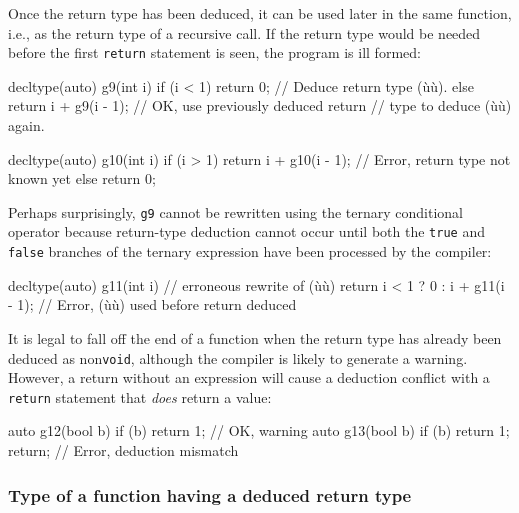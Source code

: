 \noindent Once the return type has been deduced, it can be used later in the same
function, i.e., as the return type of a recursive call. If the return
type would be needed before the first \lstinline!return! statement is seen,
the program is ill formed:

\begin{emcppslisting}
decltype(auto) g9(int i)
{
    if (i < 1) { return 0; }              // Deduce return type (ù{}ù).
    else       { return i + g9(i - 1); }  // OK, use previously deduced return
                                          // type to deduce (ù{}ù) again.
}

decltype(auto) g10(int i)
{
    if (i > 1) { return i + g10(i - 1); }  // Error, return type not known yet
    else       { return 0; }
}
\end{emcppslisting}
    

\noindent Perhaps surprisingly, \lstinline!g9! cannot be rewritten using the ternary
conditional operator because return-type deduction cannot occur until
both the \lstinline!true! and \lstinline!false! branches of the ternary
expression have been processed by the compiler:

\begin{emcppslisting}
decltype(auto) g11(int i)  // erroneous rewrite of (ù{}ù)
{
    return i < 1 ? 0 : i + g11(i - 1);
        // Error, (ù{}ù) used before return deduced
}
\end{emcppslisting}
    

\noindent It is legal to fall off the end of a function when the return type has
already been deduced as non\lstinline!void!, although the compiler is
likely to generate a warning. However, a return without an expression
will cause a deduction conflict with a \lstinline!return! statement that
\emph{does} return a value:

\begin{emcppslisting}
auto g12(bool b) { if (b) return 1;         }  // OK, warning
auto g13(bool b) { if (b) return 1; return; }  // Error, deduction mismatch
\end{emcppslisting}
    

\subsubsection[Type of a function having a deduced return type]{Type of a function having a deduced return type}\label{type-of-a-function-having-a-deduced-return-type}

